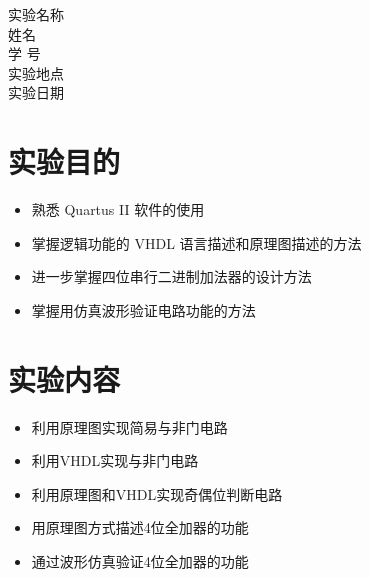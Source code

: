 \documentclass{article}
\begin{document}
\begin{titlepage}
	\vspace*{1cm}
    \begin{center}
            \Large 实验名称\ \ \underline{} \\ 
            \vspace{0.3cm}
            \Large 姓名 \ \ \underline{} \\ 
            \vspace{0.3cm}
            学  号\ \ \underline{}\\
            \vspace{0.3cm}
            实验地点\ \ \underline{}\\
            \vspace{0.3cm}
            实验日期\ \ \underline{}\\
            

             
    \end{center}
        
    
\end{titlepage}

\newpage
\tableofcontents
\thispagestyle{empty}%
\listoffigures%
\thispagestyle{empty}%

\newpage
{}%


\section{实验目的}
\begin{itemize}
 \item 熟悉 Quartus II 软件的使用
 \item 掌握逻辑功能的 VHDL 语言描述和原理图描述的方法
 \item 进一步掌握四位串行二进制加法器的设计方法
 \item 掌握用仿真波形验证电路功能的方法

\end{itemize}

\section{实验内容}
\begin{itemize}
\item 利用原理图实现简易与非门电路
\item 利用VHDL实现与非门电路
\item 利用原理图和VHDL实现奇偶位判断电路
\item 用原理图方式描述4位全加器的功能
\item 通过波形仿真验证4位全加器的功能
\end{itemize}
\end{document}
